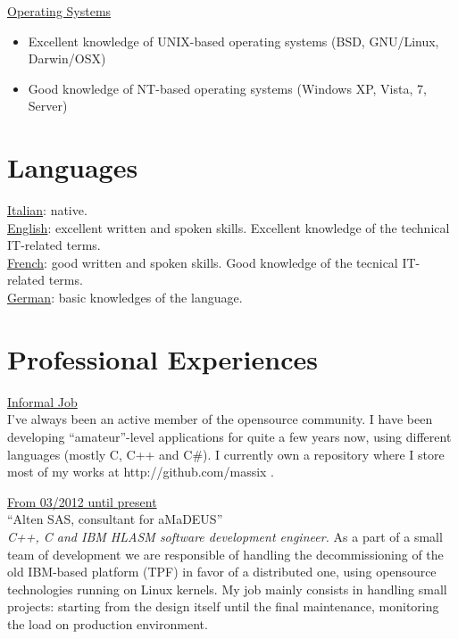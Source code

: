 \documentclass[margin]{res}
\begin{document}
\begin{resume}
	\underline{Operating Systems}
		\begin{itemize}
			\item Excellent knowledge of UNIX-based operating systems (BSD, GNU/Linux, Darwin/OSX)
			\item Good knowledge of NT-based operating systems (Windows XP, Vista, 7, Server)
		\end{itemize}
	

\section{Languages} 
\underline{Italian}: native. \\
\underline{English}: excellent written and spoken skills. Excellent knowledge of the technical 
IT-related terms. \\
\underline{French}: good written and spoken skills. Good knowledge of the tecnical
IT-related terms. \\
\underline{German}: basic knowledges of the language. \\
 

\section{Professional Experiences}
\underline{Informal Job} \\
I've always been an active member of the opensource community. I have been developing ``amateur''-level
applications for quite a few years now, using different languages (mostly C, C++ and C\#). I currently
own a repository where I store most of my works at http://github.com/massix .

\vspace{2mm}

\underline{From 03/2012 until present} \\
``Alten SAS, consultant for aMaDEUS'' \\
\emph{C++, C and IBM HLASM software development engineer.}
As a part of a small team of development we are responsible of handling the decommissioning of the
old IBM-based platform (TPF) in favor of a distributed one, using opensource technologies running
on Linux kernels. My job mainly consists in handling small projects: starting from the design itself
until the final maintenance, monitoring the load on production environment.


\end{resume}
\end{document}
